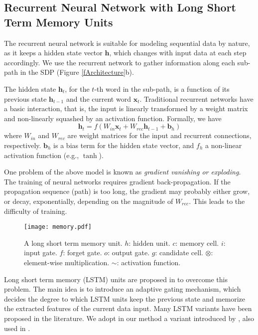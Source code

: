\documentclass[11pt,a4paper]{article}
\begin{document}
\subsection{Recurrent Neural Network with Long Short Term Memory Units}\label{ssLSTM}

The recurrent neural network is suitable for modeling sequential data
by nature, as it keeps a hidden state vector $\bm h$, which changes with input
data at each step accordingly. We use the recurrent network to gather information
along each sub-path in the SDP (Figure \ref{fArchitecture}b).

The hidden state $\bm h_t$, for the $t$-th word in the sub-path, is a function of its previous
state $\bm h_{t-1}$ and the current word $\bm x_t$.
Traditional recurrent networks have a basic interaction, that is, the input is linearly transformed by a weight matrix and non-linearly squashed by an activation function.
Formally, we have
$$\bm h_t=f(W_{in}\bm x_t+W_{rec}\bm h_{t-1}+\bm b_h)$$
where $W_{in}$ and $W_{rec}$ are weight matrices for the input and
recurrent connections, respectively.
$\bm b_h$ is a bias term for the hidden state vector,
and $f_h$ a non-linear activation function (e.g., $\operatorname{tanh}$).

One problem of the above model is known as
\textit{gradient vanishing or exploding}.
The training of neural networks requires gradient back-propagation.
If the propagation sequence (path) is too long,
the gradient may probably either grow, or decay, exponentially,
depending on the magnitude of $W_{rec}$.
This leads to the difficulty of training.

\begin{figure}[!t]
\texttt{[image: memory.pdf]}
\caption{A long short term memory unit.
$h$: hidden unit. $c$: memory cell. $i$: input gate.
$f$: forget gate. $o$: output gate.
$g$: candidate cell. $\otimes$: element-wise multiplication.
$\sim$: activation function.}\label{fLSTM}
\end{figure}


Long short term memory (LSTM) units are proposed in 
to overcome this problem. The main idea is to introduce an adaptive
gating mechanism,
which decides the degree to which LSTM units keep the previous state and
memorize the extracted features of the current data input.
Many LSTM variants have been proposed in the literature.
We adopt in our method a variant introduced by ,
also used in .
\end{document}
